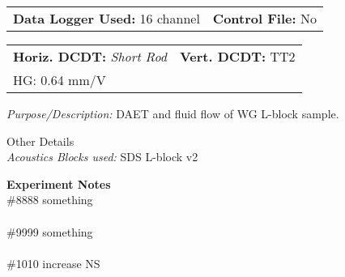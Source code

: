 \documentclass[letterpaper,10pt]{article}
\renewcommand{\arraystretch}{1.5}
\begin{document}
\renewcommand{\arraystretch}{1}
\begin{tabular}{ p{11cm} p{10cm} }
	\textbf{Data Logger Used: }16 channel &\textbf{Control File: }No  \\
\end{tabular}
\medskip 

\begin{tabular}{ p{11cm} p{10cm} }
	\textbf{Horiz. DCDT:} \textit{Short Rod} & \textbf{Vert. DCDT: }TT2 \\
	HG: 0.64 mm/V &
\end{tabular}
\medskip 

\textit{Purpose/Description: }
DAET and fluid flow of WG L-block sample. 

Other Details
\\ 
 
\textit{Acoustics Blocks used: }
SDS L-block v2

\newpage 
 \textbf{Experiment Notes} 
    \medskip \\ \#8888 something \\ \\ \#9999 something \\ \\ \#1010 increase NS \\ 
\end{document}
